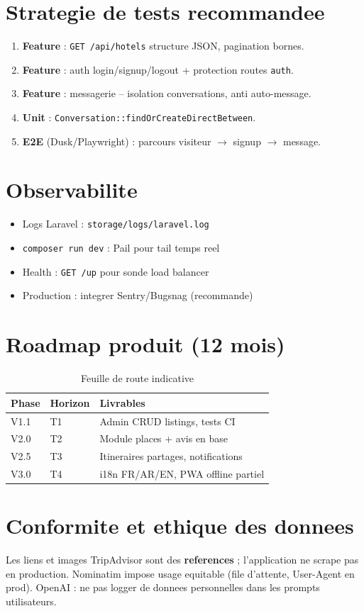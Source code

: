\section{Strategie de tests recommandee}

\begin{enumerate}
  \item \textbf{Feature} : \texttt{GET /api/hotels} structure JSON, pagination bornes.
  \item \textbf{Feature} : auth login/signup/logout + protection routes \texttt{auth}.
  \item \textbf{Feature} : messagerie -- isolation conversations, anti auto-message.
  \item \textbf{Unit} : \texttt{Conversation::findOrCreateDirectBetween}.
  \item \textbf{E2E} (Dusk/Playwright) : parcours visiteur $\rightarrow$ signup $\rightarrow$ message.
\end{enumerate}

\section{Observabilite}

\begin{itemize}
  \item Logs Laravel : \texttt{storage/logs/laravel.log}
  \item \texttt{composer run dev} : Pail pour tail temps reel
  \item Health : \texttt{GET /up} pour sonde load balancer
  \item Production : integrer Sentry/Bugsnag (recommande)
\end{itemize}

\section{Roadmap produit (12 mois)}

\begin{table}[H]
\centering
\caption{Feuille de route indicative}
\begin{tabular}{@{}llp{7cm}@{}}
\toprule
\textbf{Phase} & \textbf{Horizon} & \textbf{Livrables} \\
\midrule
V1.1 & T1 & Admin CRUD listings, tests CI \\
V2.0 & T2 & Module places + avis en base \\
V2.5 & T3 & Itineraires partages, notifications \\
V3.0 & T4 & i18n FR/AR/EN, PWA offline partiel \\
\bottomrule
\end{tabular}
\end{table}

\section{Conformite et ethique des donnees}

Les liens et images TripAdvisor sont des \textbf{references} ; l'application ne scrape pas en production. Nominatim impose usage equitable (file d'attente, User-Agent en prod). OpenAI : ne pas logger de donnees personnelles dans les prompts utilisateurs.
